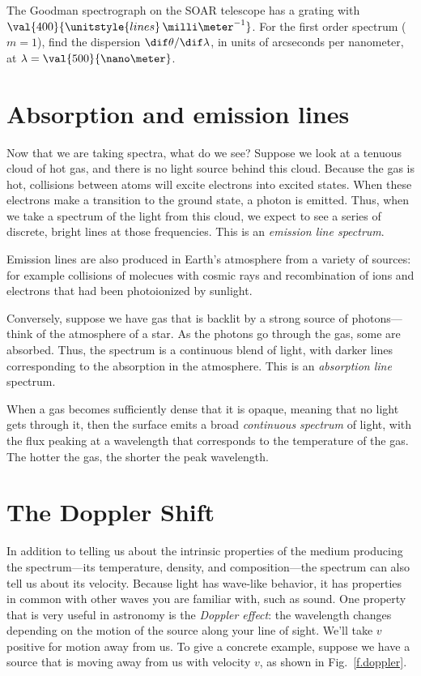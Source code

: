 \begin{exercisebox}
The Goodman spectrograph on the SOAR telescope has a grating with $\val{400}{\unitstyle{lines}\,\milli\meter^{-1}}$. For the first order spectrum ($m=1$), find the dispersion $\dif\theta/\dif\lambda$, in units of arcseconds per nanometer, at $\lambda = \val{500}{\nano\meter}$.
\end{exercisebox}

\section{Absorption and emission lines}
Now that we are taking spectra, what do we see?  Suppose we look at a tenuous cloud of hot gas, and there is no light source behind this cloud. Because the gas is hot, collisions between atoms will excite electrons into excited states. When these electrons make a transition to the ground state, a photon is emitted. Thus, when we take a spectrum of the light from this cloud, we expect to see a series of discrete, bright lines at those frequencies. This is an \emph{emission line spectrum}. 

Emission lines are also produced in Earth's atmosphere from a variety of sources: for example collisions of molecues with cosmic rays and recombination of ions and electrons that had been photoionized by sunlight.

Conversely, suppose we have gas that is backlit by a strong source of photons---think of the atmosphere of a star. As the photons go through the gas, some are absorbed. Thus, the spectrum is a continuous blend of light, with darker lines corresponding to the absorption in the atmosphere.  This is an \emph{absorption line} spectrum.

When a gas becomes sufficiently dense that it is opaque, meaning that no light gets through it, then the surface emits a broad \emph{continuous spectrum} of light, with the flux peaking at a wavelength that corresponds to the temperature of the gas. The hotter the gas, the shorter the peak wavelength.


\section{The Doppler Shift}\label{s.doppler}

In addition to telling us about the intrinsic properties of the medium producing the spectrum---its temperature, density, and composition---the spectrum can also tell us about its velocity. Because light has wave-like behavior, it has properties in common with other waves you are familiar with, such as sound.  One property that is very useful in astronomy is the \emph{Doppler effect}: the wavelength changes depending on the motion of the source along your line of sight. We'll take $v$ positive for motion away from us. To give a concrete example, suppose we have a source that is moving away from us with velocity $v$, as shown in Fig.~\ref{f.doppler}. 

